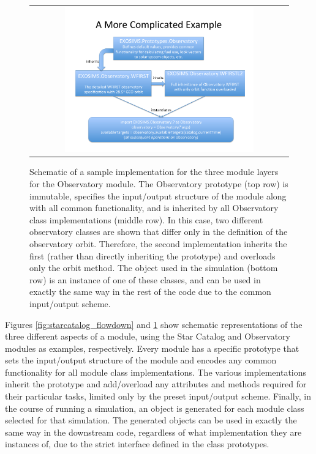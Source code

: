 \documentclass[cleanfoot]{asme2ej}
\begin{document}
\begin{figure}[ht]
    \begin{center}
        \begin{tabular}{c}
             \includegraphics[width=0.75\textwidth]{observatory_flowdown}
        \end{tabular}
    \end{center}
    \caption{Schematic of a sample implementation for the three module layers for the Observatory module. The Observatory prototype (top row) is immutable, specifies the input/output structure of the module along with all common functionality, and is inherited by all Observatory class implementations (middle row).  In this case, two different observatory classes are shown that differ only in the definition of the observatory orbit.  Therefore, the second implementation inherits the first (rather than directly inheriting the prototype) and overloads only the orbit method. The object used in the simulation (bottom row) is an instance of one of these classes, and can be used in exactly the same way in the rest of the code due to the common input/output scheme.}
    \label{fig:observatory_flowdown}
\end{figure}

Figures \ref{fig:starcatalog_flowdown} and \ref{fig:observatory_flowdown} show schematic representations of the three different aspects of a module, using the Star Catalog and Observatory modules as examples, respectively.  Every module has a specific prototype that sets the input/output structure of the module and encodes any common functionality for all module class implementations.  The various implementations inherit the prototype and add/overload any attributes and methods required for their particular tasks, limited only by the preset input/output scheme.  Finally, in the course of running a simulation, an object is generated for each module class selected for that simulation.  The generated objects can be used in exactly the same way in the downstream code, regardless of what implementation they are instances of, due to the strict interface defined in the class prototypes.
\end{document}
